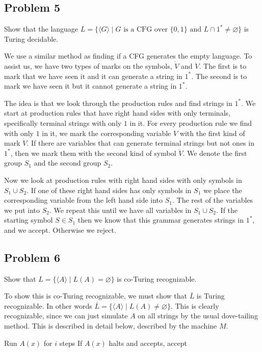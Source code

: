 \documentclass[english]{article}
\begin{document}
\subsection*{Problem 5}
Show that the language 
$L = \{ \langle G \rangle \mid
	\textrm{$G$ is a CFG over $\{0,1\}$ and $L \cap 1^* \neq \varnothing$}\}$
is Turing decidable.

We use a similar method as finding if a CFG generates the empty language.
To assist us, we have two types of marks on the symbols, $\dot{V}$ and
$\ddot{V}$. The first is to mark that we have seen it and it can generate
a string in $1^*$. The second is to mark we have seen it but it cannot
generate a string in $1^*$.  

The idea is that we look through the production rules and find strings in
$1^*$. We start at production rules that have right hand sides with only 
terminals, specifically terminal strings with only $1$ in it. For every
production rule we find with only $1$ in it, we mark the corresponding
variable $V$ with the first kind of mark $\dot{V}$. If there are 
variables that can generate terminal strings but not ones in $1^*$,
then we mark them with the second kind of symbol $\ddot{V}$. We denote
the first group $S_1$ and the second group $S_2$. 

Now we look at production rules with right hand sides with only symbols
in $S_1 \cup S_2$. If one of these right hand sides has only symbols
in $S_1$ we place the corresponding variable from the left hand side
into $S_1$. The rest of the variables we put into $S_2$. We repeat this
until we have all variables in $S_1 \cup S_2$. If the starting symbol
$S \in S_1$ then we know that this grammar generates strings in $1^*$,
and we accept. Otherwise we reject.

\subsection*{Problem 6}
Show that $L = \{ \langle A \rangle \mid L(A) = \varnothing \}$ is 
co-Turing recognizable.

To show this is co-Turing recognizable, we must show that $\bar{L}$ is Turing
recognizable. In other words $\bar{L} = \{ \langle A \rangle \mid
L(A) \neq \varnothing \}$. This is clearly recognizable, since we can just
simulate $A$ on all strings by the usual dove-tailing method. This is described
in detail below, described by the machine $M$.

\begin{algorithmic}
			\State Run $A(x)$ for $i$ steps
			\State If $A(x)$ halts and accepts, accept
		\EndFor 
	\EndFor
\EndFunction
\end{algorithmic}
\end{document}
